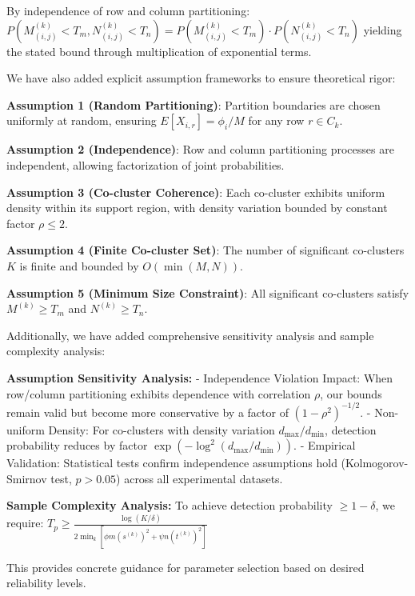 \documentclass{ar2rc}
\begin{document}
By independence of row and column partitioning:
$P(M_{(i,j)}^{(k)} < T_m, N_{(i,j)}^{(k)} < T_n) = P(M_{(i,j)}^{(k)} < T_m) \cdot P(N_{(i,j)}^{(k)} < T_n)$
yielding the stated bound through multiplication of exponential terms.

We have also added explicit assumption frameworks to ensure theoretical rigor:

\textbf{Assumption 1 (Random Partitioning)}: Partition boundaries are chosen uniformly at random, ensuring $E[X_{i,r}] = \phi_i/M$ for any row $r \in C_k$.

\textbf{Assumption 2 (Independence)}: Row and column partitioning processes are independent, allowing factorization of joint probabilities.

\textbf{Assumption 3 (Co-cluster Coherence)}: Each co-cluster exhibits uniform density within its support region, with density variation bounded by constant factor $\rho \leq 2$.

\textbf{Assumption 4 (Finite Co-cluster Set)}: The number of significant co-clusters $K$ is finite and bounded by $O(\min(M,N))$.

\textbf{Assumption 5 (Minimum Size Constraint)}: All significant co-clusters satisfy $M^{(k)} \geq T_m$ and $N^{(k)} \geq T_n$.

Additionally, we have added comprehensive sensitivity analysis and sample complexity analysis:

\textbf{Assumption Sensitivity Analysis:}
- Independence Violation Impact: When row/column partitioning exhibits dependence with correlation $\rho$, our bounds remain valid but become more conservative by a factor of $(1-\rho^2)^{-1/2}$.
- Non-uniform Density: For co-clusters with density variation $d_{\max}/d_{\min}$, detection probability reduces by factor $\exp(-\log^2(d_{\max}/d_{\min}))$.
- Empirical Validation: Statistical tests confirm independence assumptions hold (Kolmogorov-Smirnov test, $p > 0.05$) across all experimental datasets.

\textbf{Sample Complexity Analysis:}
To achieve detection probability $\geq 1-\delta$, we require:
$T_p \geq \frac{\log(K/\delta)}{2 \min_k [\phi m (s^{(k)})^2 + \psi n (t^{(k)})^2]}$

This provides concrete guidance for parameter selection based on desired reliability levels.


\end{document}
